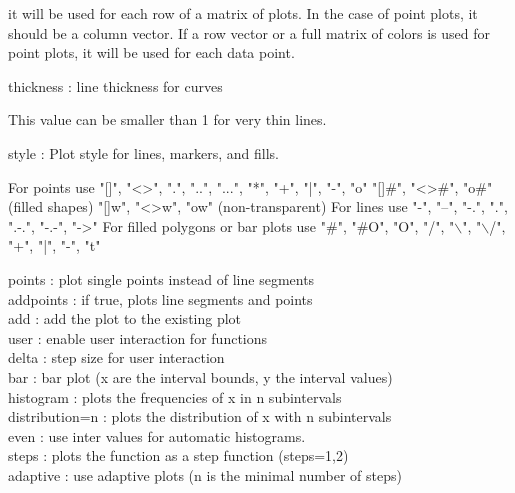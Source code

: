 \documentclass[a4paper,10pt]{article}
\begin{document}
\begin{eulernotebook}
\begin{eulercomment}
\begin{eulercomment}
\begin{eulercomment}
\begin{eulercomment}
\begin{eulercomment}
\begin{eulercomment}
\begin{eulerttcomment}
            it will be used for each row of a matrix of plots. In the case of
            point plots, it should be a column vector. If a row vector or a
            full matrix of colors is used for point plots, it will be used for
            each data point.
\end{eulerttcomment}
\begin{eulercomment}
thickness : line thickness for curves\\
\end{eulercomment}
\begin{eulerttcomment}
            This value can be smaller than 1 for very thin lines.
\end{eulerttcomment}
\begin{eulercomment}
style     : Plot style for lines, markers, and fills.\\
\end{eulercomment}
\begin{eulerttcomment}
            For points use
            "[]", "<>", ".", "..", "...",
            "*", "+", "|", "-", "o"
            "[]#", "<>#", "o#" (filled shapes)
            "[]w", "<>w", "ow" (non-transparent)
            For lines use
            "-", "--", "-.", ".", ".-.", "-.-", "->"
            For filled polygons or bar plots use
            "#", "#O", "O", "/", "\(\backslash\)", "\(\backslash\)/",
            "+", "|", "-", "t"
\end{eulerttcomment}
\begin{eulercomment}
points    : plot single points instead of line segments\\
addpoints : if true, plots line segments and points\\
add       : add the plot to the existing plot\\
user      : enable user interaction for functions\\
delta     : step size for user interaction\\
bar       : bar plot (x are the interval bounds, y the interval values)\\
histogram : plots the frequencies of x in n subintervals\\
distribution=n : plots the distribution of x with n subintervals\\
even      : use inter values for automatic histograms.\\
steps     : plots the function as a step function (steps=1,2)\\
adaptive  : use adaptive plots (n is the minimal number of steps)\\

\end{eulercomment}
\end{eulercomment}
\end{eulercomment}
\end{eulercomment}
\end{eulercomment}
\end{eulercomment}
\end{eulercomment}
\end{eulernotebook}
\end{document}
